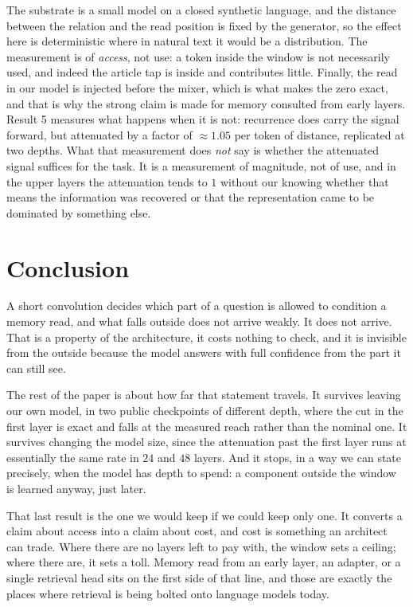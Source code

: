 \documentclass[10pt]{article}
\begin{document}
The substrate is a small model on a closed synthetic language, and the distance between the relation
and the read position is fixed by the generator, so the effect here is deterministic where in natural
text it would be a distribution. The measurement is of \emph{access}, not use: a token inside the window
is not necessarily used, and indeed the article tap is inside and contributes little. Finally, the read
in our model is injected before the mixer, which is what makes the zero exact, and that is why the
strong claim is made for memory consulted from early layers. Result 5 measures what happens when it is
not: recurrence does carry the signal forward, but attenuated by a factor of $\approx 1.05$ per token
of distance, replicated at two depths. What that measurement does \emph{not} say is whether the
attenuated signal suffices for the task. It is a measurement of magnitude, not of use, and in the
upper layers the attenuation tends to $1$ without our knowing whether that means the information was
recovered or that the representation came to be dominated by something else.

\section{Conclusion}

A short convolution decides which part of a question is allowed to condition a memory read, and what
falls outside does not arrive weakly. It does not arrive. That is a property of the architecture, it
costs nothing to check, and it is invisible from the outside because the model answers with full
confidence from the part it can still see.

The rest of the paper is about how far that statement travels. It survives leaving our own model, in
two public checkpoints of different depth, where the cut in the first layer is exact and falls at the
measured reach rather than the nominal one. It survives changing the model size, since the attenuation
past the first layer runs at essentially the same rate in $24$ and $48$ layers. And it stops, in a way
we can state precisely, when the model has depth to spend: a component outside the window is learned
anyway, just later.

That last result is the one we would keep if we could keep only one. It converts a claim about access
into a claim about cost, and cost is something an architect can trade. Where there are no layers left
to pay with, the window sets a ceiling; where there are, it sets a toll. Memory read from an early
layer, an adapter, or a single retrieval head sits on the first side of that line, and those are
exactly the places where retrieval is being bolted onto language models today.
\end{document}
